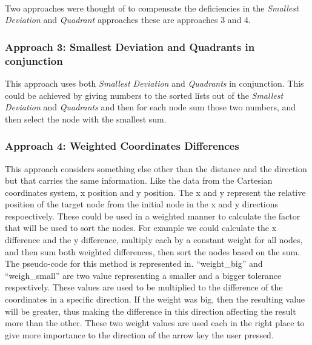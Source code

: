 \paragraph{}
Two approaches were thought of to compensate the deficiencies in the {\it Smallest Deviation} and {\it Quadrant} approaches these are approaches 3 and 4.

\subsubsection{Approach 3: Smallest Deviation and Quadrants in conjunction}
This approach uses both {\it Smallest Deviation} and {\it Quadrants} in conjunction. This could be achieved by giving numbers to the sorted lists out of the {\it Smallest Deviation} and  {\it Quadrants} and then for each node sum those two numbers, and then select the node with the smallest sum. %

\subsubsection{Approach 4: Weighted Coordinates Differences}
This approach considers something else other than the distance and the direction but that carries the same information. Like the data from the Cartesian coordinates system, x position and y position. The x and y represent the relative position of the target node from the initial node in the x and y directions respoectively. These could be used in a weighted manner to calculate the factor that will be used to sort the nodes. For example we could calculate the x difference and the y difference, multiply each by a constant weight for all nodes, and then sum both weighted differences, then sort the nodes based on the sum. The pseudo-code for this method is represented in. ``weight\_big'' and ``weigh\_small'' are two value representing a smaller and a bigger tolerance respectively. These values are used to be multiplied to the difference of the coordinates in a specific direction. If the weight was big, then the resulting value will be greater, thus making the difference in this direction affecting the result more than the other. These two weight values are used each in the right place to give more importance to the direction of the arrow key the user pressed.


